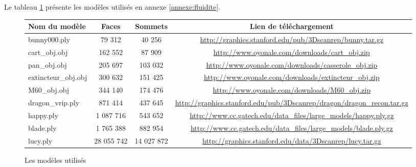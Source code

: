 Le tableau \ref{tab:modeles} présente les modèles utilisés en annexe \ref{annexe:fluidite}.


\begin{figure}
  \begin{changemargin}{-4cm}{-4cm}
    \centering
    \begin{tabular}{|l|c|c|c|}
      \hline
      Nom du modèle & Faces & Sommets & Lien de téléchargement \\ \hline \hline
      bunny000.ply & 79 312 & 40 256 & \url{http://graphics.stanford.edu/pub/3Dscanrep/bunny.tar.gz} \\ \hline
      cart\_obj.obj & 162 552 & 87 909 & \url{http://www.oyonale.com/downloads/cart_obj.zip} \\ \hline
      pan\_obj.obj & 205 697 & 103 032 & \url{http://www.oyonale.com/downloads/casserole_obj.zip} \\ \hline
      extincteur\_obj.obj & 300 632 & 151 425 & \url{http://www.oyonale.com/downloads/extincteur_obj.zip} \\ \hline
      M60\_obj.obj & 344 140 & 174 476 & \url{http://www.oyonale.com/downloads/M60_obj.zip} \\ \hline
      dragon\_vrip.ply & 871 414 & 437 645 & \url{http://graphics.stanford.edu/pub/3Dscanrep/dragon/dragon_recon.tar.gz} \\ \hline
      happy.ply & 1 087 716 & 543 652 & \url{http://www.cc.gatech.edu/data_files/large_models/happy.ply.gz} \\ \hline
      blade.ply & 1 765 388 & 882 954 & \url{http://www.cc.gatech.edu/data_files/large_models/blade.ply.gz} \\ \hline
      lucy.ply & 28 055 742 & 14 027 872 & \url{http://graphics.stanford.edu/data/3Dscanrep/lucy.tar.gz} \\ \hline
    \end{tabular}
    \caption{Les modèles utilisés}
    \label{tab:modeles}
  \end{changemargin}
\end{figure}
